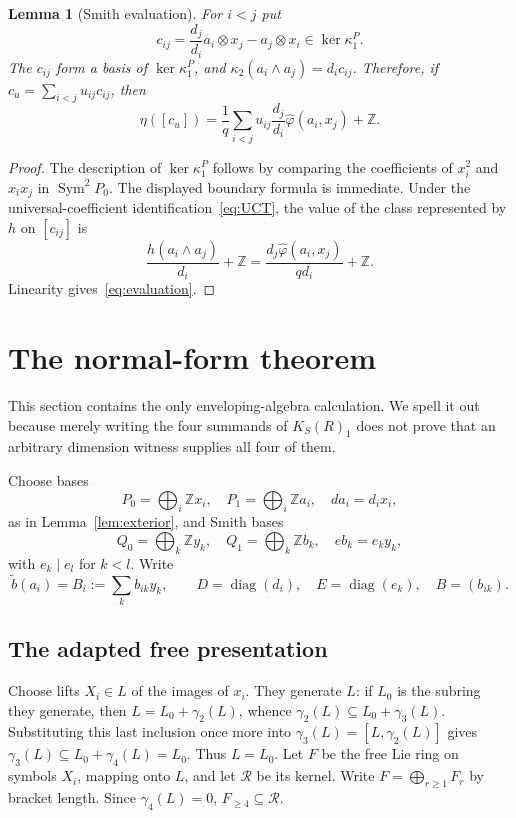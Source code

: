 \documentclass[11pt]{amsart}
\newtheorem{lemma}[theorem]{Lemma}
\theoremstyle{remark}
\newcommand{\Z}{\mathbb Z}
\newcommand{\Sym}{\operatorname{Sym}}
\newcommand{\gm}{\gamma}
\begin{document}
\begin{lemma}[Smith evaluation]\label{lem:evaluation}
For $i<j$ put
\[
 c_{ij}=\frac{d_j}{d_i}a_i\otimes x_j-a_j\otimes x_i
       \in\ker\kappa_1^P.
\]
The $c_{ij}$ form a basis of $\ker\kappa_1^P$, and
$\kappa_2(a_i\wedge a_j)=d_i c_{ij}$.  Therefore, if
$c_u=\sum_{i<j}u_{ij}c_{ij}$, then
\begin{equation}\label{eq:evaluation}
 \eta([c_u])=\frac1q\sum_{i<j}u_{ij}\frac{d_j}{d_i}
                  \widehat\varphi(a_i,x_j)+\Z.
\end{equation}
\end{lemma}

\begin{proof}
The description of $\ker\kappa_1^P$ follows by comparing the
coefficients of $x_i^2$ and $x_ix_j$ in $\Sym^2P_0$.  The displayed
boundary formula is immediate.  Under the universal-coefficient
identification~\eqref{eq:UCT}, the value of the class represented by
$h$ on $[c_{ij}]$ is
\[
 \frac{h(a_i\wedge a_j)}{d_i}+\Z
 =\frac{d_j\widehat\varphi(a_i,x_j)}{qd_i}+\Z.
\]
Linearity gives~\eqref{eq:evaluation}.
\end{proof}

\section{The normal-form theorem}\label{sec:normal}

This section contains the only enveloping-algebra calculation.  We
spell it out because merely writing the four summands of
$K_S(R)_1$ does not prove that an arbitrary dimension witness supplies
all four of them.

Choose bases
\[
 P_0=\bigoplus_i\Z x_i,\quad P_1=\bigoplus_i\Z a_i,
 \quad da_i=d_ix_i,
\]
as in Lemma~\ref{lem:exterior}, and Smith bases
\[
 Q_0=\bigoplus_k\Z y_k,\quad Q_1=\bigoplus_k\Z b_k,
 \quad eb_k=e_ky_k,
\]
with $e_k\mid e_l$ for $k<l$.  Write
\begin{equation}\label{eq:Bmatrix}
       \widetilde b(a_i)=B_i:=\sum_k b_{ik}y_k,
 \qquad D=\operatorname{diag}(d_i),\quad
 E=\operatorname{diag}(e_k),\quad B=(b_{ik}).
\end{equation}

\subsection{The adapted free presentation}

Choose lifts $X_i\in L$ of the images of $x_i$.  They generate $L$:
if $L_0$ is the subring they generate, then $L=L_0+\gm_2(L)$, whence
$\gm_2(L)\subseteq L_0+\gm_3(L)$.  Substituting this last inclusion
once more into $\gm_3(L)=[L,\gm_2(L)]$ gives
$\gm_3(L)\subseteq L_0+\gm_4(L)=L_0$.  Thus $L=L_0$.
Let $F$ be the free Lie ring on symbols $X_i$, mapping onto $L$, and
let $\mathcal R$ be its kernel.  Write
$F=\bigoplus_{r\geq1}F_r$ by bracket length.  Since $\gm_4(L)=0$,
$F_{\geq4}\subseteq\mathcal R$.
\end{document}
